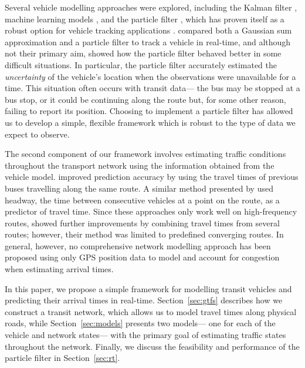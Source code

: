 Several vehicle modelling approaches were explored, 
including the Kalman filter \citep{Dailey_2001,Cathey_2003},
machine learning models \citep{Yu_2006,Chang_2010},
and the particle filter \citep{Hans_2015},
which has proven itself as a robust option for
\rt vehicle tracking applications
\citep{Gustafsson_2002,Davidson_2011}.
\cite{Ulmke_2006} compared both a Gaussian sum approximation and a particle filter
to track a vehicle in real-time,
and although not their primary aim,
showed how the particle filter behaved better in some difficult situations.
In particular, the particle filter accurately estimated the \emph{uncertainty}
of the vehicle's location when the observations were unavailable for a time.
This situation often occurs with transit data---%
the bus may be stopped at a bus stop, or it could be continuing along the route but,
for some other reason, failing to report its position.
Choosing to implement a particle filter has allowed us
to develop a simple, flexible framework
which is robust to the type of data we expect to observe.


The second component of our framework 
involves estimating traffic conditions throughout the transport network
using the information obtained from the vehicle model.
\cite{Yu_2010} improved prediction accuracy by using the travel times
of previous buses travelling along the same route.
A similar method presented by \cite{Hans_2015}
used headway, the time between consecutive vehicles at a point on the route,
as a predictor of travel time.
Since these approaches only work well on high-frequency routes,
\cite{Yu_2011} showed further improvements by combining travel times 
from several routes;
however, their method was limited to predefined converging routes.
In general, however, no comprehensive network modelling approach has been proposed using
only GPS position data to model and account for congestion when estimating arrival times.


In this paper, we propose a simple framework for modelling transit vehicles and predicting
their arrival times in real-time.
Section~\ref{sec:gtfs} describes how we construct a transit network,
which allows us to model travel times along physical roads,
while Section~\ref{sec:models} presents two \rt models---%
one for each of the vehicle and network states---%
with the primary goal of estimating \rt traffic states throughout the network.
Finally, we discuss the \rt feasibility and performance
of the particle filter in Section~\ref{sec:rt}.



